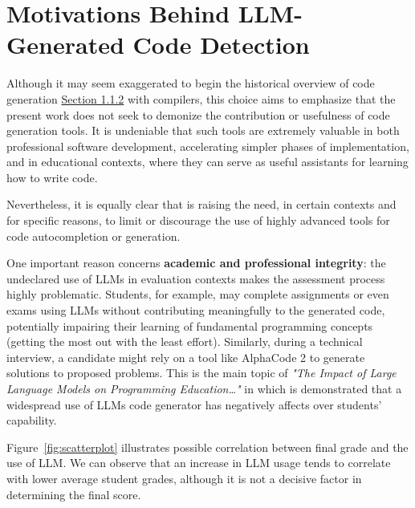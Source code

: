 \clearpage
\section{Motivations Behind LLM-Generated Code Detection}
\label{sec:Motivations Behind LLM-Generated Code Detection}
Although it may seem exaggerated to begin the historical 
overview of code generation 
\hyperref[sec:Code_Generator]{Section 1.1.2} with compilers, 
this choice aims to emphasize that the present work does not 
seek to demonize the contribution or usefulness of code 
generation tools. It is undeniable that such tools are 
extremely valuable in both professional software development, 
accelerating simpler phases of implementation, and 
in educational contexts, where they can serve as 
useful assistants for learning how to write code.

Nevertheless, it is equally clear that is raising 
the need, in certain contexts 
and for specific reasons, to limit or discourage 
the use of highly advanced tools for code autocompletion 
or generation.

\vspace{1\baselineskip}
\noindent

One important reason concerns \textbf{academic and 
professional integrity}: the undeclared use of 
LLMs in evaluation contexts makes the assessment 
process highly problematic. Students, for example, 
may complete assignments or even exams using LLMs 
without contributing meaningfully to the generated 
code, potentially impairing their learning of 
fundamental programming concepts 
(getting the most out with the least effort). Similarly, 
during a technical interview, a candidate might 
rely on a tool like AlphaCode 2 to generate solutions 
to proposed problems.
This is the main topic of
\textit{"The Impact of Large Language Models on 
Programming Education…"} \cite{Jost2024LLM}
in which is demonstrated that a widespread use of 
LLMs code generator has negatively affects 
over students' capability.

Figure~\ref{fig:scatterplot} illustrates 
possible correlation between final grade and the
use of LLM. We can observe that an increase 
in LLM usage tends to correlate with lower 
average student grades, although it is not a 
decisive factor in determining the final score.


